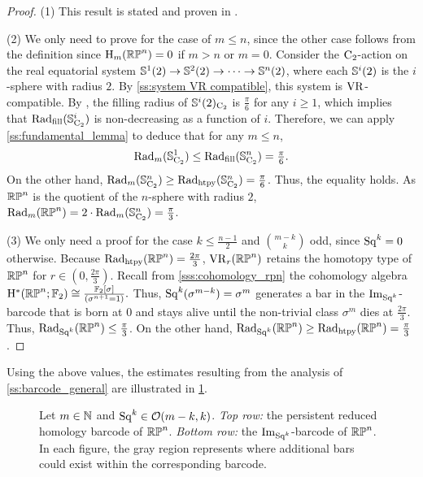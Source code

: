 \begin{proof}
	(1) This result is stated and proven in \cite[Thm.~4.5]{adams2022metric}.

	\smallskip (2) We only need to prove for the case of $m\leq n$, since the other case follows from the definition since \(\mathrm{H}_m(\mathbb{RP}^n) = 0\) if \(m > n\) or \(m = 0\).
    Consider the \(\mathrm{C}_2\)-action on the real equatorial system \(\mathbb{S}^{1}(2) \to \mathbb{S}^{2}(2) \to \dotsb \to \mathbb{S}^{n}(2)\), where each $\mathbb{S}^{i}(2)$ is the $i$-sphere with radius $2$.
    By \cref{ss:system VR compatible}, this system is \(\mathrm{VR}\)-compatible.
    By \cite{katz1983filling}, the filling radius of $\mathbb{S}^{i}(2)_{\mathrm{C}_2}$ is $\frac{\pi}{6}$ for any $i \geq 1$, which implies that $\mathrm{Rad}_{\mathrm{fill}}(\mathbb{S}^{i}_{\mathrm{C}_2})$ is non-decreasing as a function of \(i\).
    Therefore, we can apply \cref{ss:fundamental_lemma} to deduce that for any \(m \leq n\),
    \[
    \mathrm{Rad}_{m}(\mathbb{S}^{1}_{\mathrm{C}_2}) \leq \mathrm{Rad}_{\mathrm{fill}}(\mathbb{S}^{n}_{\mathrm{C}_2}) = \tfrac{\pi}{6}.
    \]
    On the other hand, $\mathrm{Rad}_{m}(\mathbb{S}^{n}_{\mathrm{C}_2})\geq \mathrm{Rad}_{\mathrm{htpy}}(\mathbb{S}^{n}_{\mathrm{C}_2}) = \tfrac{\pi}{6}$.
    Thus, the equality holds.
    As $\mathbb{RP}^n$ is the quotient of the $n$-sphere with radius $2$, $\mathrm{Rad}_{m}(\mathbb{RP}^n) = 2\cdot \mathrm{Rad}_{m}(\mathbb{S}^{n}_{\mathrm{C}_2}) = \frac{\pi}{3}$.

	\smallskip (3) We only need a proof for the case $k \leq \frac{n-1}{2}$ and $\binom{m-k}{k}$ odd, since \(\mathrm{Sq}^k = 0\) otherwise.
	Because $\mathrm{Rad}_{\mathrm{htpy}}(\mathbb{RP}^n)=\frac{2\pi}{3}$, $\mathrm{VR}_r(\mathbb{RP}^n)$ retains the homotopy type of $\mathbb{RP}^n$ for $r \in (0,\tfrac{2\pi}{3})$.
    Recall from \cref{sss:cohomology_rpn} the cohomology algebra \(\mathrm{H}^\ast(\mathbb{RP}^n; {\mathbb{F}_2}) \cong \frac{{\mathbb{F}_2}[\sigma]}{(\sigma^{n+1} = 1)}.\)
    Thus, $\mathrm{Sq}^k(\sigma^{m-k}) = \sigma^{m}$ generates a bar in the $\operatorname{Im}_{\mathrm{Sq}^k}$-barcode that is born at $0$ and stays alive until the non-trivial class $\sigma^{m}$ dies at $\tfrac{2\pi}{3}$.
	Thus, $\mathrm{Rad}_{\mathrm{Sq}^k}(\mathbb{RP}^n) \leq \tfrac{\pi}{3}$.
	On the other hand, $\mathrm{Rad}_{\mathrm{Sq}^k}(\mathbb{RP}^n) \geq \mathrm{Rad}_{\mathrm{htpy}}(\mathbb{RP}^n) = \tfrac{\pi}{3}$.
\end{proof}

Using the above values, the estimates resulting from the analysis of \cref{ss:barcode_general} are illustrated in \cref{fig:sq barcodes}.

\begin{figure}
	\centering
	
	\caption{Let $m \in \mathbb{N}$ and $\mathrm{Sq}^k \in \mathcal{O}(m-k, k)$.
        \emph{Top row:} the persistent reduced homology barcode of $\mathbb{RP}^n$.
		\emph{Bottom row:} the $\operatorname{Im}_{\mathrm{Sq}^k}$-barcode of $\mathbb{RP}^n$.
        In each figure, the gray region represents where additional bars could exist within the corresponding barcode.}
	\label{fig:sq barcodes}
\end{figure}

